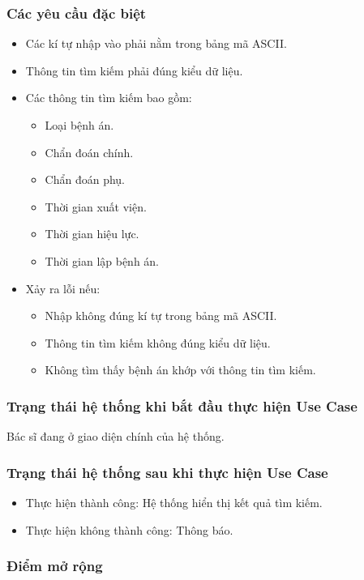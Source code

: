 \subsubsection{Các yêu cầu đặc biệt}
\begin{itemize}
    \item Các kí tự nhập vào phải nằm trong bảng mã ASCII.
    \item Thông tin tìm kiếm phải đúng kiểu dữ liệu.
    \item Các thông tin tìm kiếm bao gồm:
    \begin{itemize}
        \item Loại bệnh án.
        \item Chẩn đoán chính.
        \item Chẩn đoán phụ.
        \item Thời gian xuất viện.
        \item Thời gian hiệu lực.
        \item Thời gian lập bệnh án.
    \end{itemize}
    \item Xảy ra lỗi nếu:
    \begin{itemize}
        \item Nhập không đúng kí tự trong bảng mã ASCII.
        \item Thông tin tìm kiếm không đúng kiểu dữ liệu.
        \item Không tìm thấy bệnh án khớp với thông tin tìm kiếm.
    \end{itemize}
\end{itemize}

\subsubsection{Trạng thái hệ thống khi bắt đầu thực hiện Use Case}
Bác sĩ đang ở giao diện chính của hệ thống.

\subsubsection{Trạng thái hệ thống sau khi thực hiện Use Case}
\begin{itemize}
    \item Thực hiện thành công: Hệ thống hiển thị kết quả tìm kiếm.
    \item Thực hiện không thành công: Thông báo.
\end{itemize}

\subsubsection{Điểm mở rộng}